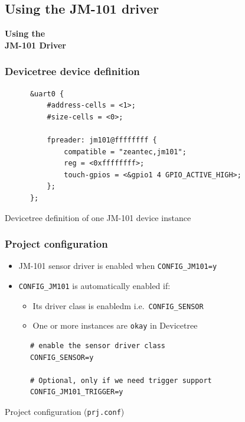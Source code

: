\documentclass[handout]{beamer}
\begin{document}
\subsection{Using the JM-101 driver}

\begin{frame}
  \begin{center}
    \Large \textbf{Using the\\JM-101 Driver}
  \end{center}
\end{frame}

\begin{frame}[fragile]
  \frametitle{Devicetree device definition}

  \begin{listing}[H]
    \begin{verbatim}
      &uart0 {
          #address-cells = <1>;
          #size-cells = <0>;

          fpreader: jm101@ffffffff {
              compatible = "zeantec,jm101";
              reg = <0xffffffff>;
              touch-gpios = <&gpio1 4 GPIO_ACTIVE_HIGH>;
          };
      };
    \end{verbatim}
    \caption{Devicetree definition of one JM-101 device instance}
  \end{listing}
\end{frame}

\begin{frame}[fragile]
  \frametitle{Project configuration}

  \begin{itemize}
    \item JM-101 sensor driver is enabled when \texttt{CONFIG\_JM101=y}
    \item \texttt{CONFIG\_JM101} is automatically enabled if:
          \begin{itemize}
            \item Its driver class is enabledm i.e.\ \texttt{CONFIG\_SENSOR}
            \item One or more instances are \texttt{okay} in Devicetree
          \end{itemize}
  \end{itemize}
  \begin{listing}[H]
    \begin{verbatim}
      # enable the sensor driver class
      CONFIG_SENSOR=y

      # Optional, only if we need trigger support
      CONFIG_JM101_TRIGGER=y
    \end{verbatim}
    \caption{Project configuration (\texttt{prj.conf})}
  \end{listing}
\end{frame}
\end{document}
